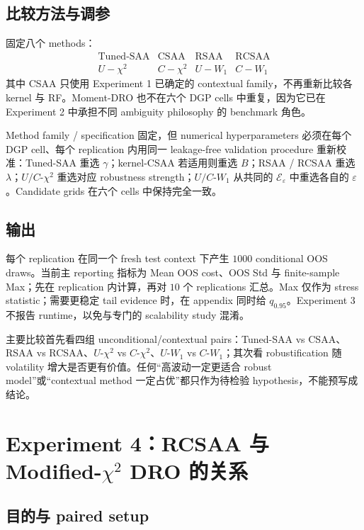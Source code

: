 \documentclass[11pt,a4paper]{ctexart}
\begin{document}
\subsection{比较方法与调参}

固定八个 methods：
\[
\boxed{
\begin{array}{cccc}
\text{Tuned-SAA} & \text{CSAA} & \text{RSAA} & \text{RCSAA}\\
U\!\!-\chi^2 & C\!\!-\chi^2 & U\!\!-W_1 & C\!\!-W_1
\end{array}}
\]
其中 CSAA 只使用 Experiment 1 已确定的 contextual family，不再重新比较各 kernel 与 RF。Moment-DRO 也不在六个 DGP cells 中重复，因为它已在 Experiment 2 中承担不同 ambiguity philosophy 的 benchmark 角色。

Method family / specification 固定，但 numerical hyperparameters 必须在每个 DGP cell、每个 replication 内用同一 leakage-free validation procedure 重新校准：Tuned-SAA 重选 $\gamma$；kernel-CSAA 若适用则重选 $B$；RSAA / RCSAA 重选 $\lambda$；$U/C$-$\chi^2$ 重选对应 robustness strength；$U/C$-$W_1$ 从共同的 $\mathcal E_{\varepsilon}$ 中重选各自的 $\varepsilon$。Candidate grids 在六个 cells 中保持完全一致。

\subsection{输出}

每个 replication 在同一个 fresh test context 下产生 $1000$ conditional OOS draws。当前主 reporting 指标为 Mean OOS cost、OOS Std 与 finite-sample Max；先在 replication 内计算，再对 $10$ 个 replications 汇总。Max 仅作为 stress statistic；需要更稳定 tail evidence 时，在 appendix 同时给 $q_{0.95}$。Experiment 3 不报告 runtime，以免与专门的 scalability study 混淆。

主要比较首先看四组 unconditional/contextual pairs：Tuned-SAA vs CSAA、RSAA vs RCSAA、$U$-$\chi^2$ vs $C$-$\chi^2$、$U$-$W_1$ vs $C$-$W_1$；其次看 robustification 随 volatility 增大是否更有价值。任何“高波动一定更适合 robust model”或“contextual method 一定占优”都只作为待检验 hypothesis，不能预写成结论。

\section{Experiment 4：RCSAA 与 Modified-$\chi^2$ DRO 的关系}

\subsection{目的与 paired setup}
\end{document}
